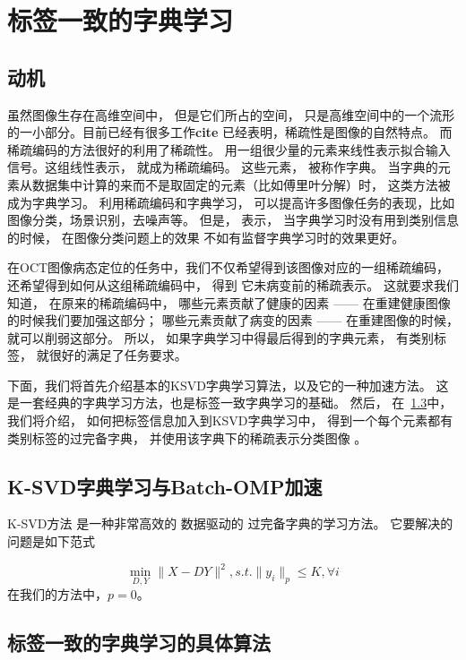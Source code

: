 \section{标签一致的字典学习}
\label{sec:lc-ksvd}
    \subsection{动机}
    虽然图像生存在高维空间中， 但是它们所占的空间， 只是高维空间中的一个流形的一小部分。目前已经有很多工作\textbf{cite} 已经表明，稀疏性是图像的自然特点。 而稀疏编码的方法很好的利用了稀疏性。 用一组很少量的元素来线性表示拟合输入信号。这组线性表示， 就成为稀疏编码。 这些元素， 被称作字典。 当字典的元素从数据集中计算的来而不是取固定的元素（比如傅里叶分解）时， 这类方法被成为字典学习。  利用稀疏编码和字典学习， 可以提高许多图像任务的表现，比如图像分类\cite{}，场景识别\cite{}，去噪声\cite{}等。  但是， \cite{}表示， 当字典学习时没有用到类别信息的时候，  在图像分类问题上的效果 不如有监督字典学习时的效果更好。 

    在OCT图像病态定位的任务中，我们不仅希望得到该图像对应的一组稀疏编码， 还希望得到如何从这组稀疏编码中， 得到 它未病变前的稀疏表示。 这就要求我们 知道， 在原来的稀疏编码中， 哪些元素贡献了健康的因素 —— 在重建健康图像的时候我们要加强这部分； 哪些元素贡献了病变的因素 —— 在重建图像的时候， 就可以削弱这部分。  所以， 如果字典学习中得最后得到的字典元素， 有类别标签， 就很好的满足了任务要求。

    下面，我们将首先介绍基本的KSVD字典学习算法，以及它的一种加速方法。 这是一套经典的字典学习方法，也是标签一致字典学习的基础。 然后， 在~\ref{sec:lc-ksvdAlg}中，  我们将介绍， 如何把标签信息加入到KSVD字典学习中，  得到一个每个元素都有类别标签的过完备字典\cite{jiang2013label}， 并使用该字典下的稀疏表示分类图像 。

    \subsection{K-SVD字典学习与Batch-OMP加速} 
    K-SVD方法 \cite{aharon2006rm}是一种非常高效的 数据驱动的 过完备字典的学习方法。  它要解决的问题是如下范式 

    \begin{equation}
        \min _{D, Y} \| X - DY \| ^2 , s.t. \| y_i \| _p \le K, \forall i
    \end{equation}
    在我们的方法中，$p = 0$。

    \subsection{标签一致的字典学习的具体算法}
    \label{sec:lc-ksvdAlg}
    

